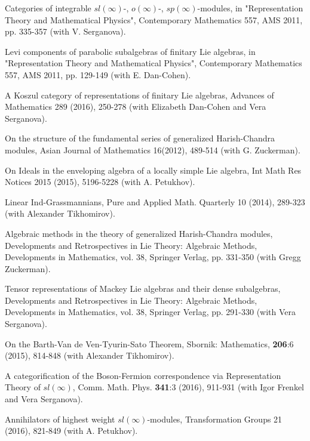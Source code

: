\documentclass[11pt]{amsart}
\begin{document}
\myss \label{54.} Categories of integrable $sl(\infty)$-, $o(\infty)$-, $sp(\infty)$-modules, in "Representation Theory and Mathematical Physics", Contemporary Mathematics 557, AMS 2011, pp. 335-357 (with V. Serganova).

\myss \label{55.} Levi components of parabolic subalgebras of finitary Lie algebras, in "Representation Theory and Mathematical Physics", Contemporary Mathematics 557, AMS 2011, pp. 129-149 (with E. Dan-Cohen).

\myss \label{56.} A Koszul category of representations of finitary Lie algebras, Advances of Mathematics 289 (2016), 250-278 (with Elizabeth Dan-Cohen and Vera Serganova).

\myss \label{57.} On the structure of the fundamental series of generalized Harish-Chandra modules, Asian Journal of Mathematics 16(2012), 489-514 (with G. Zuckerman).

\myss \label{58.} On Ideals in the enveloping algebra of a locally simple Lie algebra, Int Math Res Notices 2015 (2015), 5196-5228 (with A. Petukhov).

\myss \label{59.} Linear Ind-Grassmannians, Pure and Applied Math. Quarterly 10 (2014), 289-323 (with Alexander Tikhomirov).

\myss \label{60.} Algebraic methods in the theory of generalized Harish-Chandra modules, Developments and Retrospectives in Lie Theory: Algebraic Methods, Developments in Mathematics, vol. 38, Springer Verlag, pp. 331-350 (with Gregg Zuckerman).

\myss \label{61.} Tensor representations of Mackey Lie algebras and their dense subalgebras, Developments and Retrospectives in Lie Theory: Algebraic Methods, Developments in Mathematics, vol. 38, Springer Verlag, pp. 291-330 (with Vera Serganova).

\myss \label{62.} On the Barth-Van de Ven-Tyurin-Sato Theorem, Sbornik: Mathematics, \textbf{206}:6 (2015), 814-848 (with Alexander Tikhomirov).

\myss \label{63.} A categorification of the Boson-Fermion correspondence via Representation Theory of $sl(\infty)$,  Comm. Math. Phys. \textbf{341}:3 (2016), 911-931 (with Igor Frenkel and Vera Serganova).

\myss \label{64.} Annihilators of highest weight $sl(\infty)$-modules, Transformation Groups 21 (2016), 821-849 (with A. Petukhov).
\end{document}
